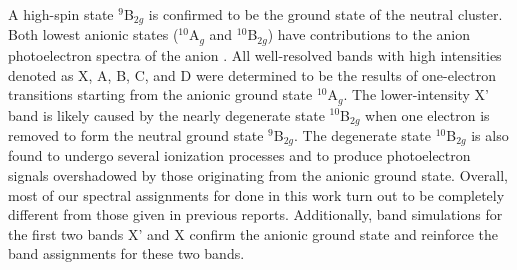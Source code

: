 \begin{refsection}
A high-spin state $^9$B$_{2g}$ is confirmed to be the ground state of the neutral cluster. Both lowest anionic states ($^{10}$A$_g$ and $^{10}$B$_{2g}$) have contributions to the anion photoelectron spectra of the anion . All well-resolved bands with high intensities denoted as X, A, B, C, and D were determined to be the results of one-electron transitions starting from the anionic ground state $^{10}$A$_g$. The lower-intensity X' band is likely caused by the nearly degenerate state $^{10}$B$_{2g}$ when one electron is removed to form the neutral ground state $^9$B$_{2g}$. The degenerate state $^{10}$B$_{2g}$ is also found to undergo several ionization processes and to produce photoelectron signals overshadowed by those originating from the anionic ground state. Overall, most of our spectral assignments for  done in this work turn out to be completely different from those given in previous reports. Additionally, band simulations for the first two bands X' and X confirm the anionic ground state and reinforce the band assignments for these two bands.







\printbibliography[heading=subbibliography] %

\end{refsection}

